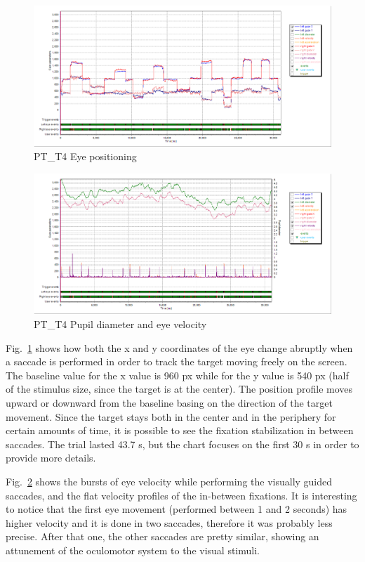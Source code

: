 \begin{figure}[t]
  \centering
  \includegraphics[width=.8\textwidth]{figures/graphs/PT_T4(saccades)_XY.png}
  \caption[PT\_T4 Eye positioning]{PT\_T4 Eye positioning}
  \label{fig:PT_T4_pos}
\end{figure}

\begin{figure}[t]
  \centering
  \includegraphics[width=.8\textwidth]{figures/graphs/PT_T4(saccades)_VP.png}
  \caption[PT\_T4 Pupil size and velocity profile]{PT\_T4 Pupil diameter and eye velocity}
  \label{fig:PT_T4_vel}
\end{figure}


Fig.~\ref{fig:PT_T4_pos} shows how both the x and y coordinates of the eye change abruptly when a saccade is performed in order to track the target moving freely on the screen. The baseline value for the x value is 960 px while for the y value is 540 px (half of the stimulus size, since the target is at the center). The position profile moves upward or downward from the baseline basing on the direction of the target movement. Since the target stays both in the center and in the periphery for certain amounts of time, it is possible to see the fixation stabilization in between saccades. The trial lasted 43.7 s, but the chart focuses on the first 30 s in order to provide more details.

Fig.~\ref{fig:PT_T4_vel} shows the bursts of eye velocity while performing the visually guided saccades, and the flat velocity profiles of the in-between fixations. It is interesting to notice that the first eye movement (performed between 1 and 2 seconds) has higher velocity and it is done in two saccades, therefore it was probably less precise. After that one, the other saccades are pretty similar, showing an attunement of the oculomotor system to the visual stimuli.





